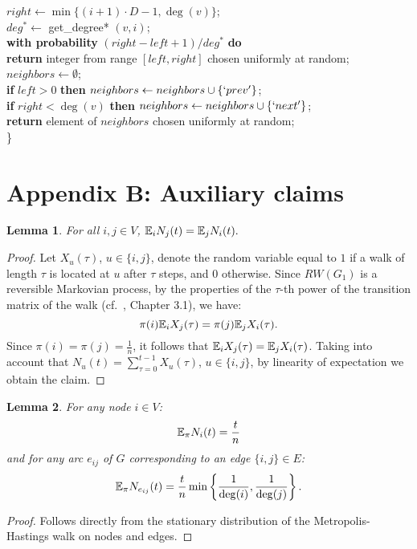 \documentclass[11pt,a4paper]{article}
\newtheorem{lemma}{Lemma}
\newcommand{\E}{\ensuremath \mathbb E}
\renewcommand{\*}{\hspace*{5mm}}
\begin{document}
\* $right \gets  \min\{(i+1)\cdot D-1, \deg(v)\}$;\\
\* $deg^* \gets$ get\_degree* $(v,i)$;\\
\* \textbf{with probability} $(right - left + 1) / deg^*$ \textbf{do}\\
\* \* \textbf{return} integer from range $[left, right]$ chosen uniformly at random;\\
\* $neighbors \gets \emptyset$;\\
\* \textbf{if} $left >0$ \textbf{then} $neighbors \gets neighbors \cup \{`prev'\}$;\\
\* \textbf{if} $right < \deg(v)$ \textbf{then} $neighbors \gets neighbors \cup \{`next'\}$;\\
\* \textbf{return} element of $neighbors$ chosen uniformly at random;\\
\}\\

\newpage
\section*{Appendix B: Auxiliary claims}


\begin{lemma}\label{lemrev}
For all $i,j\in V$, $\E_i N_j(t) = \E_j N_i(t).$
\end{lemma}

\begin{proof}
Let $X_u(\tau)$, $u\in\{i,j\}$, denote the random variable equal to $1$ if a walk of length $\tau$ is located at $u$ after $\tau$ steps, and $0$ otherwise. Since $RW(G_1)$ is a reversible Markovian process, by the properties of the $\tau$-th power of the transition matrix of the walk (cf.~\cite{AF}, Chapter 3.1), we have:
$$\pi(i) \E_i X_j(\tau) = \pi(j) \E_j X_i(\tau).$$
Since $\pi(i) = \pi(j) = \frac{1}{n}$, it follows that $\E_i X_j(\tau) = \E_j X_i(\tau)$. Taking into account that $N_u(t) = \sum_{\tau=0}^{t-1} X_u(\tau)$, $u\in\{i,j\}$, by linearity of expectation we obtain the claim.
\end{proof}


\begin{lemma}\label{lembla}
For any node $i\in V$:
\begin{equation}\label{eqU}
\E_\pi N_i(t) = \frac{t}{n}
\end{equation}
and for any arc $e_{ij}$ of $G$ corresponding to an edge $\{i,j\}\in E$:
\begin{equation}\label{eq6}
\E_\pi N_{e_{ij}}(t) = \frac{t}{n}\min\left\{\frac{1}{\deg (i)}, \frac{1}{\deg(j)}\right\}.
\end{equation}
\end{lemma}
\begin{proof}
Follows directly from the stationary distribution of the Metropolis-Hastings walk on nodes and edges.
\end{proof}
\end{document}
